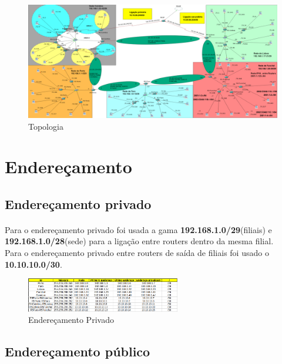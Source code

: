 \documentclass[11pt]{article}
\begin{document}
	\begin{figure}[h]
		\centering
		\includegraphics[width=1\textwidth]{topologia}
		\caption{Topologia}
		\label{fig.nav}
	\end{figure}
	
	\large
	\section{Endereçamento}
	\subsection{Endereçamento privado}
	\normalsize
    \paragraph{}

    Para o endereçamento privado foi usada a gama \textbf{192.168.1.0/29}(filiais) e \textbf{192.168.1.0/28}(sede) para a ligação entre routers dentro da mesma filial. \\
    Para o endereçamento privado entre routers de saída de filiais foi usado o \textbf{10.10.10.0/30}.

    \begin{figure}[h]
		\centering
		\includegraphics[width=0.6\textwidth]{privado}
		\caption{Endereçamento Privado}
		\label{fig.nav}
	\end{figure}

	\subsection{Endereçamento público}
	\normalsize
	\paragraph{}
    
\end{document}
